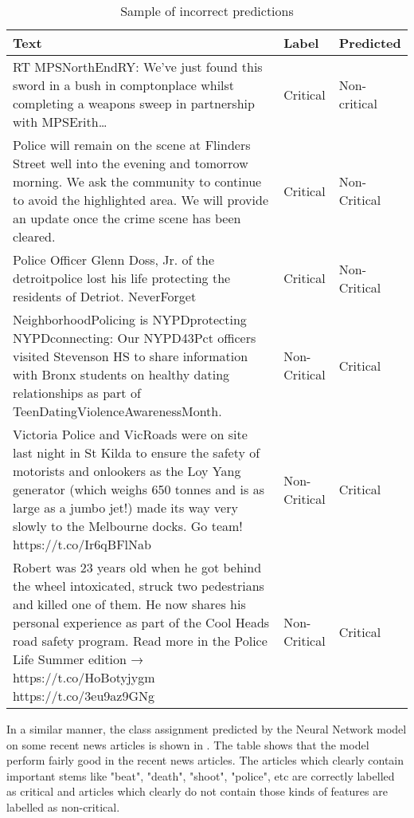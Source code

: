 \begin{table}
\begin{center}
\caption{Sample of incorrect predictions}
\label{tbl:incorrect_predictions}
\begin{tabular}{p{10cm}p{2cm}p{2cm}}
\toprule 
Text&Label&Predicted\\
\midrule 
RT MPSNorthEndRY: We've just found this sword in a bush in comptonplace whilst completing a weapons sweep in partnership with MPSErith…&Critical&Non-critical\\
\hline
Police will remain on the scene at Flinders Street well into the evening and tomorrow morning. We ask the community to continue to avoid the highlighted area. We will provide an update once the crime scene has been cleared. &Critical&Non-Critical\\
\hline
Police Officer Glenn Doss, Jr. of the detroitpolice lost his life protecting the residents of Detriot. NeverForget &Critical&Non-Critical\\
\hline
NeighborhoodPolicing is NYPDprotecting NYPDconnecting: Our NYPD43Pct officers visited Stevenson HS to share information with Bronx students on healthy dating relationships as part of TeenDatingViolenceAwarenessMonth.&Non-Critical&Critical\\
\hline
Victoria Police and VicRoads were on site last night in St Kilda to ensure the safety of motorists and onlookers as the Loy Yang generator (which weighs 650 tonnes and is as large as a jumbo jet!) made its way very slowly to the Melbourne docks. Go team! https://t.co/Ir6qBFlNab
&Non-Critical&Critical\\
\hline
Robert was 23 years old when he got behind the wheel intoxicated, struck two pedestrians and killed one of them. He now shares his personal experience as part of the Cool Heads road safety program. Read more in the Police Life Summer edition → https://t.co/HoBotyjygm https://t.co/3eu9az9GNg&Non-Critical&Critical\\
\bottomrule
\end{tabular}
\end{center}
\end{table}

In a similar manner, the class assignment predicted by the Neural Network model on some recent news articles is shown in . The table shows that the model perform fairly good in the recent news articles. The articles which clearly contain important stems like "beat", "death", "shoot", "police", etc are correctly labelled as critical and articles which clearly do not contain those kinds of features are labelled as non-critical.

